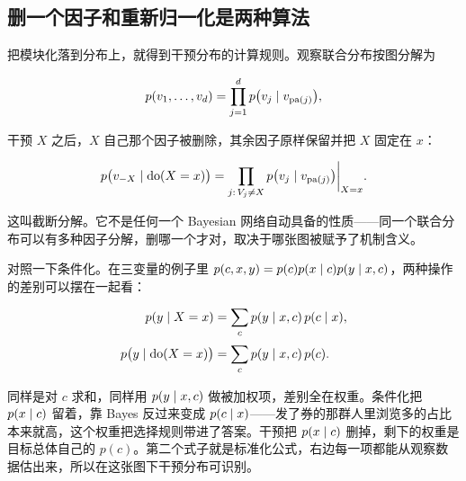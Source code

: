 \subsection{删一个因子和重新归一化是两种算法}

把模块化落到分布上，就得到干预分布的计算规则。观察联合分布按图分解为

\[
p(v_1,\ldots,v_d)=\prod_{j=1}^{d}p\bigl(v_j\mid v_{\operatorname{pa}(j)}\bigr),
\]

干预 \(X\) 之后，\(X\) 自己那个因子被删除，其余因子原样保留并把 \(X\) 固定在 \(x\)：

\[
p\bigl(v_{-X}\mid\operatorname{do}(X=x)\bigr)
=\prod_{j:\,V_j\ne X}p\bigl(v_j\mid v_{\operatorname{pa}(j)}\bigr)\bigg|_{X=x}.
\]

这叫截断分解。它不是任何一个 Bayesian 网络自动具备的性质——同一个联合分布可以有多种因子分解，删哪一个才对，取决于哪张图被赋予了机制含义。

对照一下条件化。在三变量的例子里 \(p(c,x,y)=p(c)p(x\mid c)p(y\mid x,c)\)，两种操作的差别可以摆在一起看：

\[
\begin{aligned}
p(y\mid X=x)&=\sum_c p(y\mid x,c)\,p(c\mid x),\\[2pt]
p\bigl(y\mid\operatorname{do}(X=x)\bigr)&=\sum_c p(y\mid x,c)\,p(c).
\end{aligned}
\]

同样是对 \(c\) 求和，同样用 \(p(y\mid x,c)\) 做被加权项，差别全在权重。条件化把 \(p(x\mid c)\) 留着，靠 Bayes 反过来变成 \(p(c\mid x)\)——发了券的那群人里浏览多的占比本来就高，这个权重把选择规则带进了答案。干预把 \(p(x\mid c)\) 删掉，剩下的权重是目标总体自己的 \(p(c)\)。第二个式子就是标准化公式，右边每一项都能从观察数据估出来，所以在这张图下干预分布可识别。


